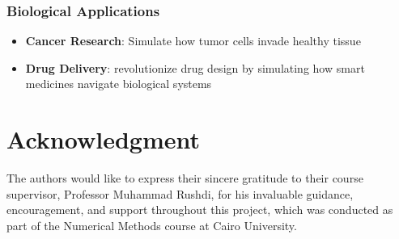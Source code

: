 \documentclass[conference]{IEEEtran}
\begin{document}
\subsubsection{Biological Applications}
\begin{itemize}
    \item \textbf{Cancer Research}: Simulate how tumor cells invade healthy tissue
    \item \textbf{Drug Delivery}: revolutionize drug design by simulating how smart medicines navigate biological systems
\end{itemize}


\section*{Acknowledgment}
The authors would like to express their sincere gratitude to their course supervisor, Professor Muhammad Rushdi, for his invaluable guidance, encouragement, and support throughout this project, which was conducted as part of the Numerical Methods course at Cairo University.




\end{document}

